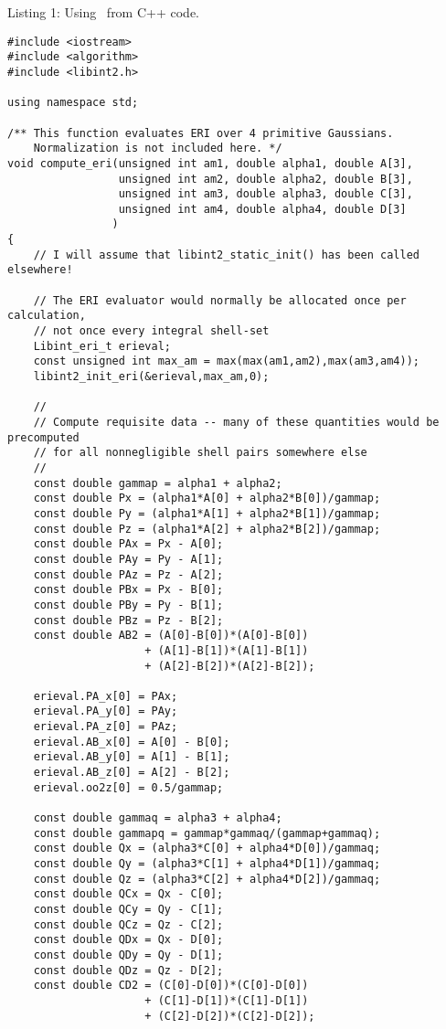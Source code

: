 \documentclass[12pt]{article}
\begin{document}
\begin{footnotesize}
Listing 1: Using \LIBINT\ from C++ code.
\begin{verbatim}
#include <iostream>
#include <algorithm>
#include <libint2.h>

using namespace std;

/** This function evaluates ERI over 4 primitive Gaussians.
    Normalization is not included here. */
void compute_eri(unsigned int am1, double alpha1, double A[3],
                 unsigned int am2, double alpha2, double B[3],
                 unsigned int am3, double alpha3, double C[3],
                 unsigned int am4, double alpha4, double D[3]
                )
{
    // I will assume that libint2_static_init() has been called elsewhere!

    // The ERI evaluator would normally be allocated once per calculation,
    // not once every integral shell-set
    Libint_eri_t erieval;
    const unsigned int max_am = max(max(am1,am2),max(am3,am4));
    libint2_init_eri(&erieval,max_am,0);

    //
    // Compute requisite data -- many of these quantities would be precomputed
    // for all nonnegligible shell pairs somewhere else
    //
    const double gammap = alpha1 + alpha2;
    const double Px = (alpha1*A[0] + alpha2*B[0])/gammap;
    const double Py = (alpha1*A[1] + alpha2*B[1])/gammap;
    const double Pz = (alpha1*A[2] + alpha2*B[2])/gammap;
    const double PAx = Px - A[0];
    const double PAy = Py - A[1];
    const double PAz = Pz - A[2];
    const double PBx = Px - B[0];
    const double PBy = Py - B[1];
    const double PBz = Pz - B[2];
    const double AB2 = (A[0]-B[0])*(A[0]-B[0])
                     + (A[1]-B[1])*(A[1]-B[1])
                     + (A[2]-B[2])*(A[2]-B[2]);
    
    erieval.PA_x[0] = PAx;
    erieval.PA_y[0] = PAy;
    erieval.PA_z[0] = PAz;
    erieval.AB_x[0] = A[0] - B[0];
    erieval.AB_y[0] = A[1] - B[1];
    erieval.AB_z[0] = A[2] - B[2];
    erieval.oo2z[0] = 0.5/gammap;
    
    const double gammaq = alpha3 + alpha4;
    const double gammapq = gammap*gammaq/(gammap+gammaq);
    const double Qx = (alpha3*C[0] + alpha4*D[0])/gammaq;
    const double Qy = (alpha3*C[1] + alpha4*D[1])/gammaq;
    const double Qz = (alpha3*C[2] + alpha4*D[2])/gammaq;
    const double QCx = Qx - C[0];
    const double QCy = Qy - C[1];
    const double QCz = Qz - C[2];
    const double QDx = Qx - D[0];
    const double QDy = Qy - D[1];
    const double QDz = Qz - D[2];
    const double CD2 = (C[0]-D[0])*(C[0]-D[0])
                     + (C[1]-D[1])*(C[1]-D[1])
                     + (C[2]-D[2])*(C[2]-D[2]);
    

\end{verbatim}
\end{footnotesize}
\end{document}
